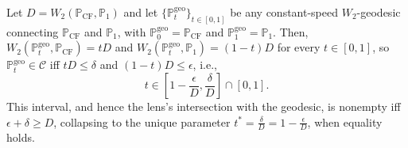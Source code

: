 \begin{proposition}\label{prop:cf-tradeoff}
Let $D
=
W_2(\mathbb{P}_{\mathrm{CF}},\mathbb{P}_1)$
and let $\{\mathbb{P}^{\mathrm{geo}}_t\}_{t\in[0,1]}$ be any constant-speed $W_2$-geodesic connecting $\mathbb{P}_{\mathrm{CF}}$ and $\mathbb{P}_1$, with
$\mathbb{P}^{\mathrm{geo}}_0=\mathbb{P}_{\mathrm{CF}}$ and $\mathbb{P}^{\mathrm{geo}}_1=\mathbb{P}_{1}$. Then, $W_2(\mathbb{P}^{\mathrm{geo}}_t,\mathbb{P}_{\mathrm{CF}})=tD$ and $W_2(\mathbb{P}^{\mathrm{geo}}_t,\mathbb{P}_{\mathrm{1}})=(1-t)D$ for every $t\in[0,1]$, 
so $\mathbb{P}^{\mathrm{geo}}_t \in \mathcal{C} $%
iff $tD\leq\delta$ and $(1-t)D\leq\epsilon$, i.e.,
$$t \in \left[
1-\frac{\epsilon}{D},
\frac{\delta}{D}
\right]
\cap[0,1].$$
This interval, and hence the lens's intersection with the geodesic, is nonempty iff $\epsilon+\delta \geq D$, collapsing to the unique parameter $t^* =\frac{\delta}{D} = 1- \frac{\epsilon}{D}$, when equality holds.
\end{proposition}

